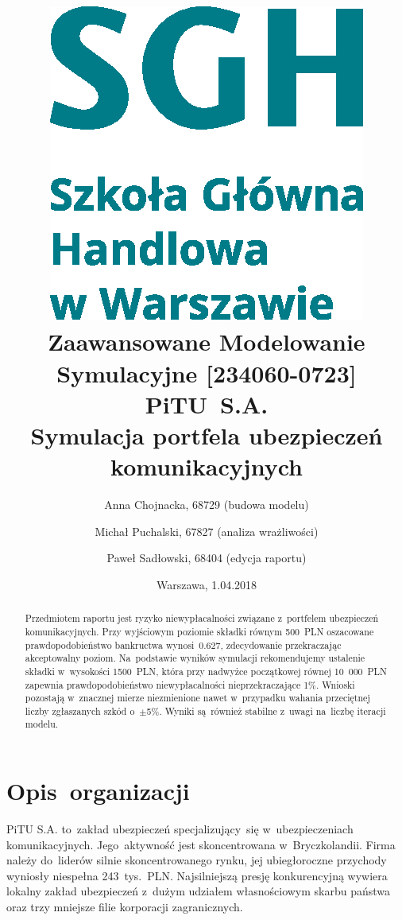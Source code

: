 \documentclass[12pt, a4paper, oneside]{mwart} %
\begin{document}
\title{\includegraphics[width = 0.3 \textwidth]{wykresy/SGHlogotypCMYKpl.eps}\\
\bigskip
Zaawansowane Modelowanie Symulacyjne [234060-0723]\\ 
\bigskip
PiTU~S.A.\\
Symulacja portfela ubezpieczeń komunikacyjnych}
\author{Anna Chojnacka, 68729 (budowa modelu) \and
Michał Puchalski, 67827 (analiza wrażliwości) \and
Paweł Sadłowski, 68404 (edycja raportu)}
\date{Warszawa, 1.04.2018}
\maketitle

\begin{abstract}
Przedmiotem raportu jest ryzyko niewypłacalności związane z~portfelem ubezpieczeń komunikacyjnych. Przy wyjściowym poziomie składki równym 500~PLN oszacowane prawdopodobieństwo bankructwa wynosi~0.627, zdecydowanie przekraczając akceptowalny poziom. Na~podstawie wyników symulacji rekomendujemy ustalenie składki w~wysokości 1500~PLN, która przy nadwyżce początkowej równej 10~000~PLN zapewnia prawdopodobieństwo niewypłacalności nieprzekraczające 1\%. Wnioski pozostają w~znacznej mierze niezmienione nawet w~przypadku wahania przeciętnej liczby zgłaszanych szkód o~$\pm$5\%. Wyniki są~również stabilne z~uwagi na~liczbę iteracji modelu.
\end{abstract}

\pagebreak

\section{Opis~organizacji}
PiTU S.A. to~zakład ubezpieczeń specjalizujący~się w~ubezpieczeniach komunikacyjnych. Jego~aktywność jest skoncentrowana w~Bryczkolandii. Firma należy do~liderów silnie skoncentrowanego rynku, jej ubiegłoroczne przychody wyniosły niespełna 243~tys.~PLN. Najsilniejszą presję konkurencyjną wywiera lokalny zakład ubezpieczeń z~dużym udziałem własnościowym skarbu państwa oraz trzy mniejsze filie korporacji zagranicznych.
\end{document}
